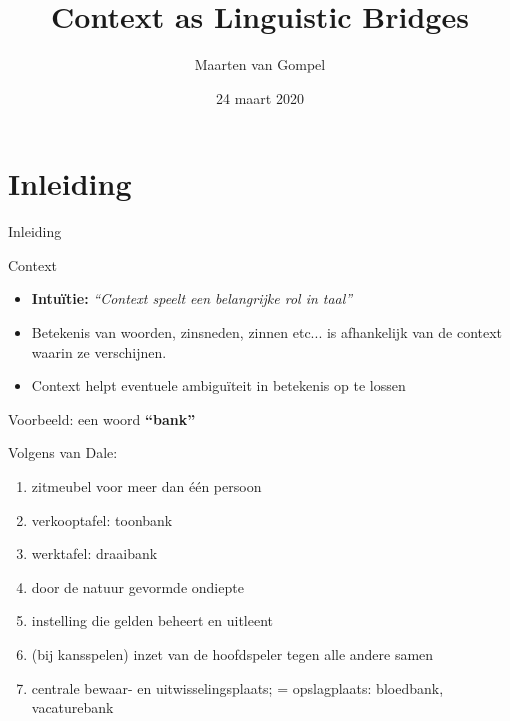 \documentclass[8pt]{beamer}
\title{\textbf{Co}ntext as \textbf{Li}nguistic \textbf{Bri}dges}
\author{Maarten van Gompel}
\date{\vspace{-10ex} {24 maart 2020}}
\begin{document}
\begin{frame}
	\titlepage
\end{frame}

\section{Inleiding}

\begin{frame}{Inleiding}

	\begin{block}{Context}
        \begin{itemize}
            \item \textbf{Intuïtie:} \emph{``Context speelt een belangrijke rol in taal''}
            \item Betekenis van woorden, zinsneden, zinnen etc... is afhankelijk van de context waarin ze verschijnen.
            \item Context helpt eventuele ambiguïteit in betekenis op te lossen
        \end{itemize}
	\end{block}

    \begin{block}{Voorbeeld: een woord}
        {\Large\textbf{``bank''}}

        Volgens van Dale:
        \begin{enumerate}
            \item zitmeubel voor meer dan één persoon
            \item verkooptafel: toonbank
            \item werktafel: draaibank
            \item door de natuur gevormde ondiepte
            \item instelling die gelden beheert en uitleent
            \item (bij kansspelen) inzet van de hoofdspeler tegen alle andere samen
            \item centrale bewaar- en uitwisselingsplaats; = opslagplaats: bloedbank, vacaturebank
        \end{enumerate}
    \end{block}
\end{frame}
\end{document}
